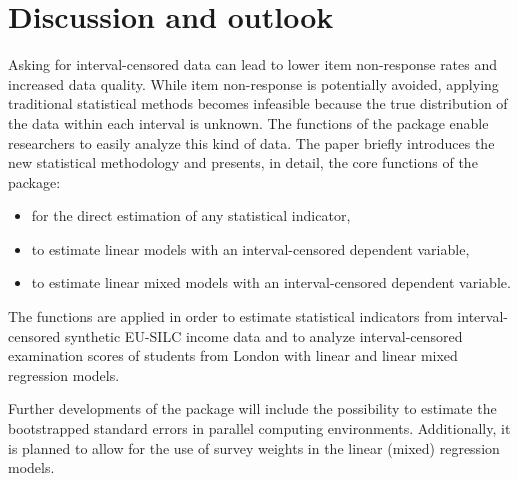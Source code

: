 \section{Discussion and outlook}\label{Sec:DisR}
Asking for interval-censored data can lead to lower item non-response rates and increased data quality. While item non-response is potentially avoided, applying traditional statistical methods becomes infeasible because the true distribution of the data within each interval is unknown. The  functions of the  package enable researchers to easily analyze this kind of data. The paper briefly introduces the new statistical methodology and presents, in detail, the core functions of the package: 
\begin{itemize}
\item {} for the direct estimation of any statistical indicator,
\item {} to estimate linear models with an interval-censored dependent variable,
\item {} to estimate linear mixed models with an interval-censored dependent variable.
\end{itemize}
The functions are applied in order to estimate statistical indicators from interval-censored synthetic EU-SILC income data and to analyze interval-censored examination scores of students from London with linear and linear mixed regression models.


Further developments of the  package will include the possibility to estimate the bootstrapped standard errors in parallel computing environments. Additionally, it is planned to allow for the use of survey weights in the linear (mixed) regression models.





\address{Paul Walter\\
  Freie Universität Berlin\\
  Garystraße 21, 14195 Berlin\\
  Germany\\
  }

